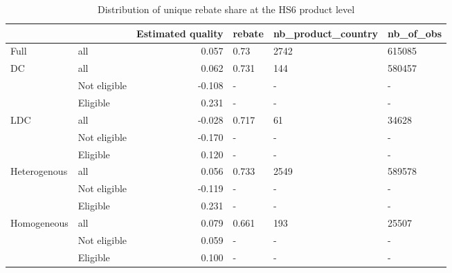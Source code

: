 \documentclass[preview]{standalone}
\begin{document}
\begin{table}[!htbp] \centering
\caption{Distribution of unique rebate share at the HS6 product level}

\begin{adjustbox}{width=\textwidth, totalheight=\baselineskip,keepaspectratio}
\begin{tabular}{llrlll}
\toprule
            &          &  Estimated quality & rebate & nb\_product\_country & nb\_of\_obs \\
\midrule
Full & all &              0.057 &   0.73 &               2742 &    615085 \\
DC & all &              0.062 &  0.731 &                144 &    580457 \\
            & Not eligible &             -0.108 &      - &                  - &         - \\
            & Eligible &              0.231 &      - &                  - &         - \\
LDC & all &             -0.028 &  0.717 &                 61 &     34628 \\
            & Not eligible &             -0.170 &      - &                  - &         - \\
            & Eligible &              0.120 &      - &                  - &         - \\
Heterogenous & all &              0.056 &  0.733 &               2549 &    589578 \\
            & Not eligible &             -0.119 &      - &                  - &         - \\
            & Eligible &              0.231 &      - &                  - &         - \\
Homogeneous & all &              0.079 &  0.661 &                193 &     25507 \\
            & Not eligible &              0.059 &      - &                  - &         - \\
            & Eligible &              0.100 &      - &                  - &         - \\
\bottomrule
\end{tabular}

\end{adjustbox}

\begin{tablenotes}
\small
\item


\end{tablenotes}
\end{table}
\end{document}
